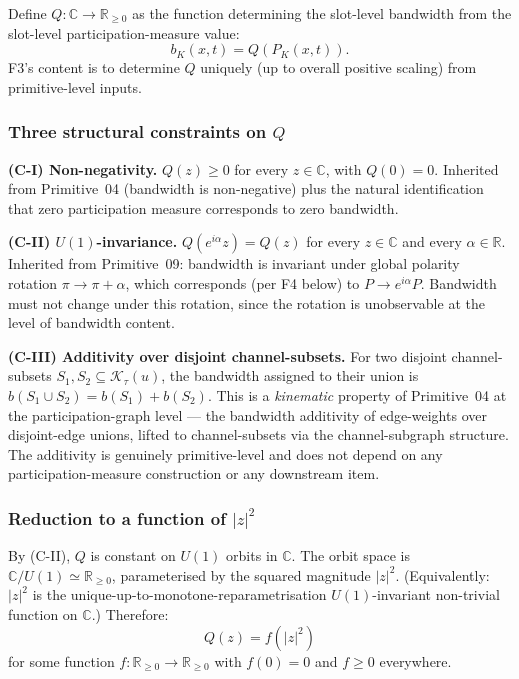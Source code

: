 \documentclass[11pt,a4paper]{article}
\begin{document}
Define $Q : \mathbb{C} \to \mathbb{R}_{\geq 0}$ as the function determining the slot-level bandwidth from the slot-level participation-measure value:
\[
b_K(x, t) = Q(P_K(x, t)).
\]
F3's content is to determine $Q$ uniquely (up to overall positive scaling) from primitive-level inputs.

\subsubsection{Three structural constraints on $Q$}

\textbf{(C-I) Non-negativity.} $Q(z) \geq 0$ for every $z \in \mathbb{C}$, with $Q(0) = 0$. Inherited from Primitive~04 (bandwidth is non-negative) plus the natural identification that zero participation measure corresponds to zero bandwidth.

\textbf{(C-II) $U(1)$-invariance.} $Q(e^{i \alpha} z) = Q(z)$ for every $z \in \mathbb{C}$ and every $\alpha \in \mathbb{R}$. Inherited from Primitive~09: bandwidth is invariant under global polarity rotation $\pi \to \pi + \alpha$, which corresponds (per F4 below) to $P \to e^{i \alpha} P$. Bandwidth must not change under this rotation, since the rotation is unobservable at the level of bandwidth content.

\textbf{(C-III) Additivity over disjoint channel-subsets.} For two disjoint channel-subsets $S_1, S_2 \subseteq \mathcal{K}_\tau(u)$, the bandwidth assigned to their union is $b(S_1 \cup S_2) = b(S_1) + b(S_2)$. This is a \emph{kinematic} property of Primitive~04 at the participation-graph level --- the bandwidth additivity of edge-weights over disjoint-edge unions, lifted to channel-subsets via the channel-subgraph structure. The additivity is genuinely primitive-level and does not depend on any participation-measure construction or any downstream item.

\subsubsection{Reduction to a function of $|z|^2$}

By (C-II), $Q$ is constant on $U(1)$ orbits in $\mathbb{C}$. The orbit space is $\mathbb{C}/U(1) \simeq \mathbb{R}_{\geq 0}$, parameterised by the squared magnitude $|z|^2$. (Equivalently: $|z|^2$ is the unique-up-to-monotone-reparametrisation $U(1)$-invariant non-trivial function on $\mathbb{C}$.) Therefore:
\[
Q(z) = f(|z|^2)
\]
for some function $f : \mathbb{R}_{\geq 0} \to \mathbb{R}_{\geq 0}$ with $f(0) = 0$ and $f \geq 0$ everywhere.
\end{document}
